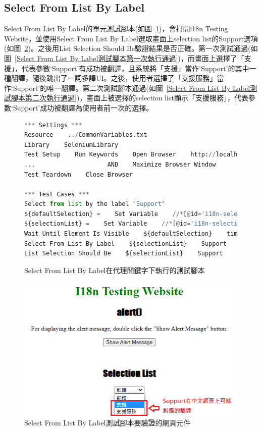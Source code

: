 \subsection{Select From List By Label}
Select From List By Label的單元測試腳本(如圖~\ref{Select From List By Label在代理關鍵字下執行的測試腳本})，會打開i18n Testing Website，並使用Select From List By Label選取畫面上selection list的Support選項(如圖~\ref{Select From List By Label測試腳本要驗證的網頁元件})。之後用List Selection Should Be驗證結果是否正確。第一次測試通過(如圖~\ref{Select From List By Label測試腳本第一次執行通過})，而畫面上選擇了「支援」，代表參數‘Support’有成功被翻譯，且系統將「支援」當作‘Support’的其中一種翻譯，隨後跳出了一詞多譯UI。之後，使用者選擇了「支援服務」當作‘Support’的唯一翻譯。第二次測試腳本通過(如圖~\ref{Select From List By Label測試腳本第二次執行通過})，畫面上被選擇的selection list顯示「支援服務」，代表參數‘Support’成功被翻譯為使用者前一次的選擇。
\hspace*{\fill} \\
\begin{figure}[H]
\begin{lstlisting}[language={python}]
*** Settings ***
Resource    ../CommonVariables.txt
Library    SeleniumLibrary
Test Setup    Run Keywords    Open Browser    http://localhost:3000    Chrome
...                    AND    Maximize Browser Window
Test Teardown    Close Browser

*** Test Cases ***
Select from list by the label "Support"
${defaultSelection} =    Set Variable    //*[@id='i18n-selection-list']//*[text()='Software' and @selected]
${selectionList} =    Set Variable    //*[@id='i18n-selection-list']
Wait Until Element Is Visible    ${defaultSelection}    timeout=${shortPeriodOfTime}
Select From List By Label    ${selectionList}    Support
List Selection Should Be    ${selectionList}    Support
\end{lstlisting}
\caption{Select From List By Label在代理關鍵字下執行的測試腳本}
\label{Select From List By Label在代理關鍵字下執行的測試腳本}
\end{figure}

\begin{figure}[H]
\centering
\includegraphics[width= .6\textwidth]{../論文截圖/4-1-7 Select from list by label要驗證的網頁元件.png}
\caption{Select From List By Label測試腳本要驗證的網頁元件}
\label{Select From List By Label測試腳本要驗證的網頁元件}
\end{figure}

